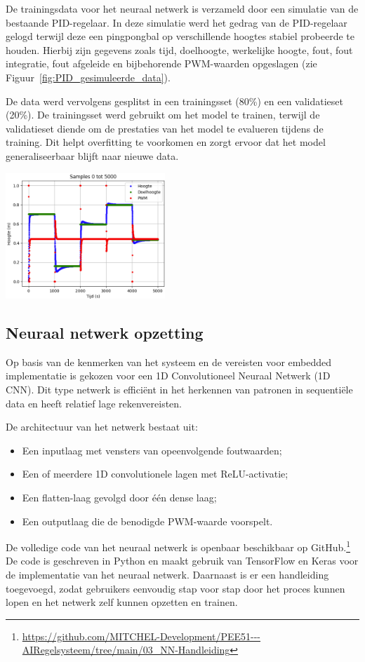 De trainingsdata voor het neuraal netwerk is verzameld door een simulatie van de bestaande PID-regelaar. In deze simulatie werd het gedrag van de PID-regelaar gelogd terwijl deze een pingpongbal op verschillende hoogtes stabiel probeerde te houden. Hierbij zijn gegevens zoals tijd, doelhoogte, werkelijke hoogte, fout, fout integratie, fout afgeleide en bijbehorende PWM-waarden opgeslagen (zie Figuur~\ref{fig:PID_gesimuleerde_data}).

De data werd vervolgens gesplitst in een trainingsset (80\%) en een validatieset (20\%). De trainingsset werd gebruikt om het model te trainen, terwijl de validatieset diende om de prestaties van het model te evalueren tijdens de training. Dit helpt overfitting te voorkomen en zorgt ervoor dat het model generaliseerbaar blijft naar nieuwe data.

\begin{center}
\centering
\includegraphics[width=0.45\textwidth]{./afbeeldingen/data.png}
\label{fig:PID_gesimuleerde_data}
\end{center}

\subsection{Neuraal netwerk opzetting}

Op basis van de kenmerken van het systeem en de vereisten voor embedded implementatie is gekozen voor een 1D Convolutioneel Neuraal Netwerk (1D CNN). Dit type netwerk is efficiënt in het herkennen van patronen in sequentiële data en heeft relatief lage rekenvereisten.

De architectuur van het netwerk bestaat uit:
\begin{itemize}
    \item Een inputlaag met vensters van opeenvolgende foutwaarden;
    \item Een of meerdere 1D convolutionele lagen met ReLU-activatie;
    \item Een flatten-laag gevolgd door één dense laag;
    \item Een outputlaag die de benodigde PWM-waarde voorspelt.
\end{itemize}
De volledige code van het neuraal netwerk is openbaar beschikbaar op GitHub.\footnote{\url{https://github.com/MITCHEL-Development/PEE51---AIRegelsysteem/tree/main/03_NN-Handleiding}} De code is geschreven in Python en maakt gebruik van TensorFlow en Keras voor de implementatie van het neuraal netwerk. Daarnaast is er een handleiding toegevoegd, zodat gebruikers eenvoudig stap voor stap door het proces kunnen lopen en het netwerk zelf kunnen opzetten en trainen.



